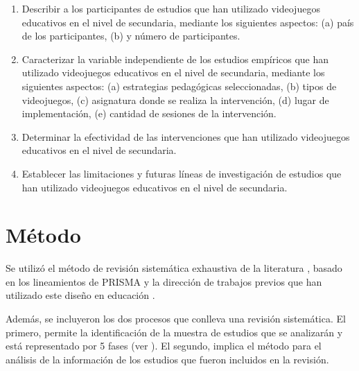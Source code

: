 \documentclass[spanish]{textolivre}
\begin{document}
\begin{enumerate}
    \item Describir a los participantes de estudios que han utilizado videojuegos educativos en el nivel de secundaria, mediante los siguientes aspectos: (a) país de los participantes, (b) y número de participantes. 
    \item Caracterizar la variable independiente de los estudios empíricos que han utilizado videojuegos educativos en el nivel de secundaria, mediante los siguientes aspectos: (a) estrategias pedagógicas seleccionadas, (b) tipos de videojuegos, (c) asignatura donde se realiza la intervención, (d) lugar de implementación, (e) cantidad de sesiones de la intervención.  
    \item Determinar la efectividad de las intervenciones que han utilizado videojuegos educativos en el nivel de secundaria.
    \item Establecer las limitaciones y futuras líneas de investigación de estudios que han utilizado videojuegos educativos en el nivel de secundaria. 
\end{enumerate}

\section{Método}\label{sec-normas}
Se utilizó el método de revisión sistemática exhaustiva de la literatura \cite{estarli_items_2016,sanchez_meca_revisiones_2010}, basado en los lineamientos de PRISMA \cite{page_declaracion_2021} y la dirección de trabajos previos que han utilizado este diseño en educación \cite{saez_revision_2018,lopez-angulo_revision_2020}. 

Además, se incluyeron los dos procesos que conlleva una revisión sistemática. El primero, permite la identificación de la muestra de estudios que se analizarán y está representado por 5 fases (ver ). El segundo, implica el método para el análisis de la información de los estudios que fueron incluidos en la revisión. 
\end{document}
